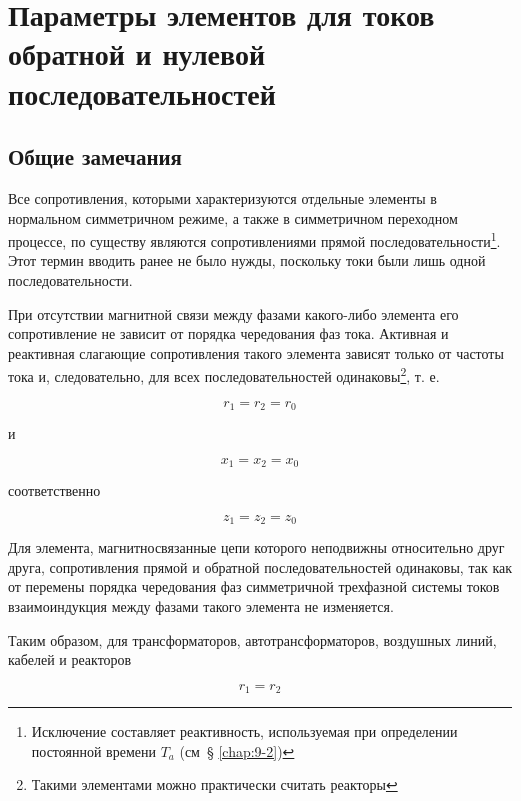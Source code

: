 \chapter{Параметры элементов для токов обратной и нулевой последовательностей}
\label{chap:12}

\section{Общие замечания}
\label{sec:12-1}

Все сопротивления, которыми характеризуются отдельные элементы в нормальном симметричном режиме, а также в симметричном переходном процессе, по существу являются сопротивлениями прямой последовательности\footnote{Исключение составляет реактивность, используемая при определении постоянной времени $ T_a $ (см~§ \ref{chap:9-2})}. Этот термин вводить ранее не было нужды, поскольку токи были лишь одной последовательности.

При отсутствии магнитной связи между фазами какого-либо элемента его сопротивление не зависит от порядка чередования фаз тока. Активная и реактивная слагающие сопротивления такого элемента зависят только от частоты тока и, следовательно, для всех последовательностей одинаковы\footnote{Такими элементами можно практически считать реакторы}, т. е.

\begin{equation*}
	r_1 = r_2 = r_0
\end{equation*}

и

\begin{equation*}
	x_1 = x_2 = x_0
\end{equation*}

соответственно

\begin{equation*}
	z_1 = z_2 = z_0
\end{equation*}

Для элемента, магнитносвязанные цепи которого неподвижны относительно друг друга, сопротивления прямой и обратной последовательностей одинаковы, так как от перемены порядка чередования фаз симметричной трехфазной системы токов взаимоиндукция между фазами такого элемента не изменяется.

Таким образом, для трансформаторов, автотрансформаторов, воздушных линий, кабелей и реакторов

\begin{equation*}
	r_1 = r_2
\end{equation*}

